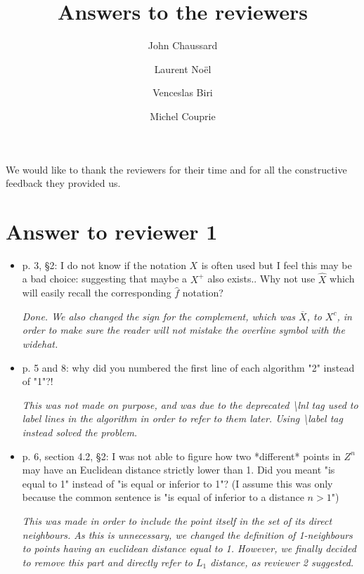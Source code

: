 \documentclass[final,envcountsame]{article}
\begin{document}
\title{Answers to the reviewers}
\author{John Chaussard \and Laurent No\"{e}l \and Venceslas Biri \and Michel Couprie}
\maketitle

We would like to thank the reviewers for their time and for all the constructive feedback they provided us.

\section{Answer to reviewer 1}

\begin{itemize}


\item p. 3, §2: I do not know if the notation $X^{­}$ is often used but I feel this may be a bad choice: suggesting that maybe a $X^{+}$ also exists.. Why not use $\widehat{X}$ which will easily recall the corresponding $\hat{f}$ notation? 

\textit{Done. We also changed the sign for the complement, which was $\overline{X}$, to $X^c$, in order to make sure the reader will not mistake the overline symbol with the widehat.} \\


\item p. 5 and 8: why did you numbered the first line of each algorithm "2" instead of "1"?! 

\textit{This was not made on purpose, and was due to the deprecated \textbackslash lnl tag used to label lines in the algorithm in order to refer to them later. Using \textbackslash label tag instead solved the problem.} \\ 


\item p. 6, section 4.2, §2: I was not able to figure how two *different* points in $Z^n$ may have an Euclidean distance strictly lower than 1. Did you meant "is equal to 1" instead of "is equal or inferior to 1"? (I assume this was only because the common sentence is "is equal of inferior to a distance $n>1$") 

\textit{This was made in order to include the point itself in the set of its direct neighbours. As this is unnecessary, we changed the definition of 1-neighbours to points having an euclidean distance equal to 1. However, we finally decided to remove this part and directly refer to $L_1$ distance, as reviewer 2 suggested.} \\



\end{itemize}
\end{document}
